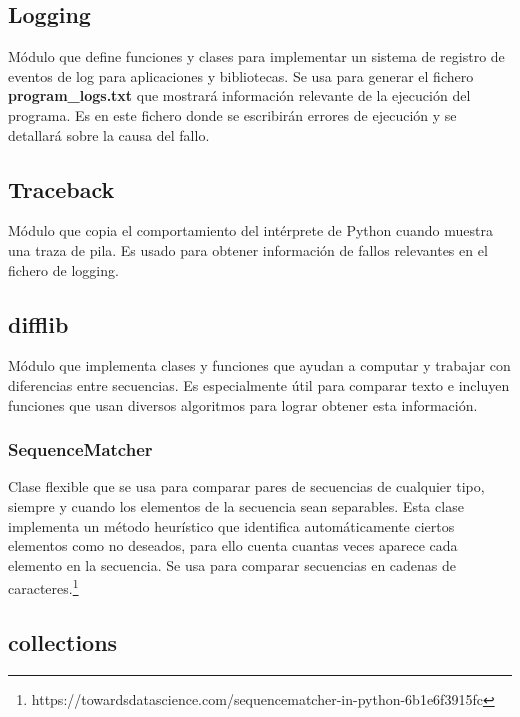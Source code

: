 \documentclass[a4paper, 12pt]{book}
\begin{document}
\subsection{Logging}
\label{sec:logging}

Módulo que define funciones y clases para implementar un sistema de registro de eventos de log para aplicaciones y bibliotecas. Se usa para generar el fichero \textbf{program\_logs.txt} que mostrará información relevante de la ejecución del programa. Es en este fichero donde se escribirán errores de ejecución y se detallará sobre la causa del fallo.

\subsection{Traceback}
\label{sec:traceback}

Módulo que copia el comportamiento del intérprete de Python cuando muestra una traza de pila. Es usado para obtener información de fallos relevantes en el fichero de logging.

\subsection{difflib}
\label{sec:difflib}

Módulo que implementa clases y funciones que ayudan a computar y trabajar con diferencias entre secuencias. Es especialmente útil para comparar texto e incluyen funciones que usan diversos algoritmos para lograr obtener esta información.

\subsubsection{SequenceMatcher}
\label{sec:difflib_SequenceMatcher} 

Clase flexible que se usa para comparar pares de secuencias de cualquier tipo, siempre y cuando los elementos de la secuencia sean separables. Esta clase implementa un método heurístico que identifica automáticamente ciertos elementos como no deseados, para ello cuenta cuantas veces aparece cada elemento en la secuencia. Se usa para comparar secuencias en cadenas de caracteres.\footnote{https://towardsdatascience.com/sequencematcher-in-python-6b1e6f3915fc}

\subsection{collections}
\label{sec:collections}
\end{document}
